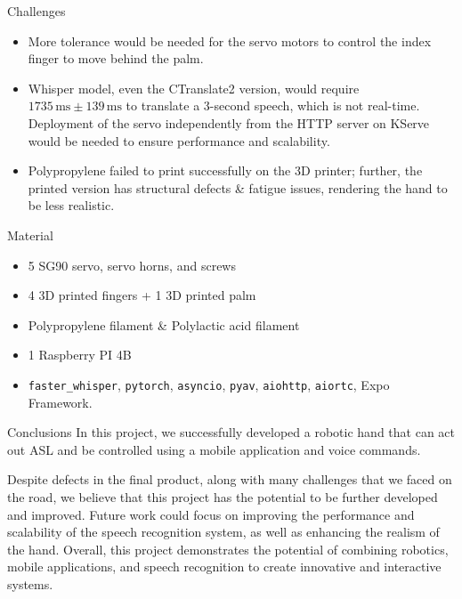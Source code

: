 \documentclass[final, 20pt]{beamer}
\newlength{\colwidth}
\begin{document}
\begin{frame}[t]
\begin{columns}[t]
\begin{column}{\colwidth}
  \begin{block}{Challenges}
    \begin{itemize}
      \item More tolerance would be needed for the servo motors to control the index finger to move behind the palm.
      \item Whisper model, even the CTranslate2 version, would require $1735\,\text{ms}\pm 139\,\text{ms}$ to translate a 3-second speech, which is not real-time. Deployment of the servo independently from the HTTP server on KServe would be needed to ensure performance and scalability.
      \item Polypropylene failed to print successfully on the 3D printer; further, the printed version has structural defects \& fatigue issues, rendering the hand to be less realistic.
    \end{itemize}
  \end{block}

  \begin{block}{Material}
    \begin{itemize}
      \item 5 SG90 servo, servo horns, and screws
      \item 4 3D printed fingers + 1 3D printed palm
      \item Polypropylene filament \& Polylactic acid filament
      \item 1 Raspberry PI 4B
      \item \texttt{faster\_whisper}, \texttt{pytorch}, \texttt{asyncio}, \texttt{pyav}, \texttt{aiohttp}, \texttt{aiortc}, Expo Framework.
    \end{itemize}
  \end{block}

  \begin{block}{Conclusions}
    In this project, we successfully developed a robotic hand that can act out ASL and be controlled using a mobile application and voice commands.

    Despite defects in the final product, along with many challenges that we faced on the road, we believe that this project has the potential to be further developed and improved. Future work could focus on improving the performance and scalability of the speech recognition system, as well as enhancing the realism of the hand. Overall, this project demonstrates the potential of combining robotics, mobile applications, and speech recognition to create innovative and interactive systems.
  \end{block}
\end{column}

\margincolumn
\end{columns}

\end{frame}
\end{document}

